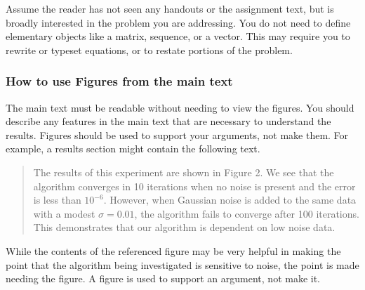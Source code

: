 \documentclass[]{article}
\begin{document}
Assume the reader has not seen any handouts or the assignment text, but is broadly interested in the problem you are addressing. You do not need to define elementary objects like a matrix, sequence, or a vector.
This may require you to rewrite or typeset equations, or to restate portions of the problem.

\subsubsection{How to use Figures from the main text}
The main text must be readable without needing to view the figures. You should describe any features in the main text that are necessary to understand the results. Figures should be used to support your arguments, not make them. For example, a results section might contain the following text.
\begin{quote}
    The results of this experiment are shown in Figure 2. We see that the algorithm converges in 10 iterations when no noise is present and the error is less than $10^{-6}$. However, when Gaussian noise is added to the same data with a modest $\sigma=0.01$, the algorithm fails to converge after 100 iterations. This demonstrates that our algorithm is dependent on low noise data.
\end{quote}

While the contents of the referenced figure may be very helpful in making the point that the algorithm being investigated is sensitive to noise, the point is made needing the figure. A figure is used to support an argument, not make it.
\end{document}
